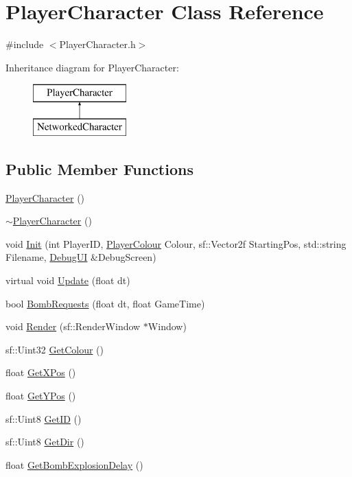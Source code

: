 \hypertarget{class_player_character}{}\section{Player\+Character Class Reference}
\label{class_player_character}


{\ttfamily \#include $<$Player\+Character.\+h$>$}

Inheritance diagram for Player\+Character\+:\begin{figure}[H]
\begin{center}
\leavevmode
\includegraphics[height=2.000000cm]{class_player_character}
\end{center}
\end{figure}
\subsection*{Public Member Functions}
\begin{DoxyCompactItemize}
\item 
\hyperlink{class_player_character_af3ac12a41f58d860fb716138578bd95f}{Player\+Character} ()
\item 
\hyperlink{class_player_character_a4915330a9f743156b6860a97e6d68e28}{$\sim$\+Player\+Character} ()
\item 
void \hyperlink{class_player_character_a780111b98376a28607aa21207b4cf91a}{Init} (int Player\+ID, \hyperlink{_player_character_8h_a3fe9312ea357fba2db18ae32ffe5bca1}{Player\+Colour} Colour, sf\+::\+Vector2f Starting\+Pos, std\+::string Filename, \hyperlink{class_debug_u_i}{Debug\+UI} \&Debug\+Screen)
\item 
virtual void \hyperlink{class_player_character_a94bbe2b48d72236a6de6cb88f492da76}{Update} (float dt)
\item 
bool \hyperlink{class_player_character_a19081e3c59bc962efb9c5e2c7887c267}{Bomb\+Requests} (float dt, float Game\+Time)
\item 
void \hyperlink{class_player_character_af46ba459570710dcca3bfd6edb0cb7f8}{Render} (sf\+::\+Render\+Window $\ast$Window)
\item 
sf\+::\+Uint32 \hyperlink{class_player_character_a0c4259c1a2eec6c1669bf9ce9ff4a646}{Get\+Colour} ()
\item 
float \hyperlink{class_player_character_aaa03186b913d3ff5673dcde280284bf5}{Get\+X\+Pos} ()
\item 
float \hyperlink{class_player_character_a666a4e7b2a642704d7435beaccb89e6a}{Get\+Y\+Pos} ()
\item 
sf\+::\+Uint8 \hyperlink{class_player_character_aa7be8bfe26290d285725f0035de6e31c}{Get\+ID} ()
\item 
sf\+::\+Uint8 \hyperlink{class_player_character_af6704dd235bd347fb3f2c59a56015b51}{Get\+Dir} ()
\item 
float \hyperlink{class_player_character_a116a731d0dd7788b0e8b8100cd97928a}{Get\+Bomb\+Explosion\+Delay} ()
\end{DoxyCompactItemize}
